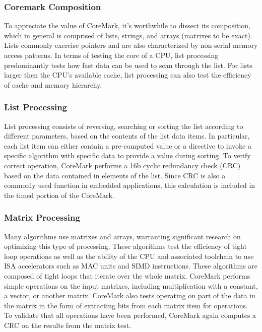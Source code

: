 \subsubsection*{Coremark Composition}
To appreciate the value of CoreMark, it’s worthwhile to dissect its composition, which in
general is comprised of lists, strings, and arrays (matrixes to be exact). Lists commonly
exercise pointers and are also characterized by non-serial memory access patterns. In
terms of testing the core of a CPU, list processing predominantly tests how fast data can
be used to scan through the list. For lists larger then the CPU’s available cache, list
processing can also test the efficiency of cache and memory hierarchy.
\subsubsection{List Processing}
List processing consists of reversing, searching or sorting the list according to different
parameters, based on the contents of the list data items. In particular, each list item can
either contain a pre-computed value or a directive to invoke a specific algorithm with
specific data to provide a value during sorting. To verify correct operation, CoreMark
performs a 16b cyclic redundancy check (CRC) based on the data contained in elements
of the list. Since CRC is also a commonly used function in embedded applications, this
calculation is included in the timed portion of the CoreMark.
\subsubsection{Matrix Processing}
Many algorithms use matrixes and arrays, warranting significant research on optimizing
this type of processing. These algorithms test the efficiency of tight loop operations as
well as the ability of the CPU and associated toolchain to use ISA accelerators such as
MAC units and SIMD instructions. These algorithms are composed of tight loops that
iterate over the whole matrix. CoreMark performs simple operations on the input
matrixes, including multiplication with a constant, a vector, or another matrix. CoreMark
also tests operating on part of the data in the matrix in the form of extracting bits from
each matrix item for operations. To validate that all operations have been performed,
CoreMark again computes a CRC on the results from the matrix test.
